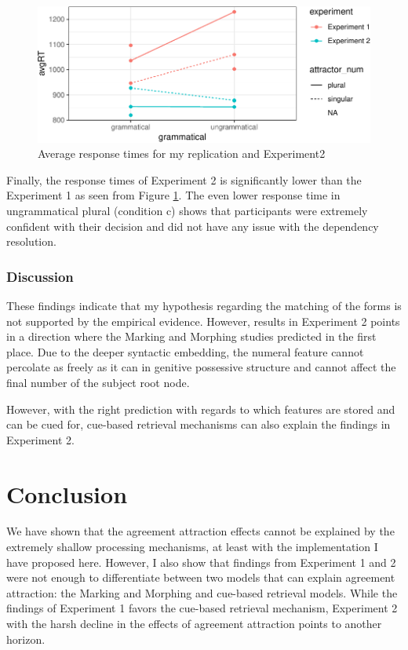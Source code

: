 \documentclass[doc]{apa6}
\begin{document}
\begin{figure}
\centering
\includegraphics{AgreementAttraction_files/figure-latex/exp2AvgRTs-1.pdf}
\caption{\label{fig:exp2AvgRTs}Average response times for my replication and Experiment2}
\end{figure}

Finally, the response times of Experiment 2 is significantly lower than the Experiment 1 as seen from Figure \ref{fig:exp2AvgRTs}. The even lower response time in ungrammatical plural (condition c) shows that participants were extremely confident with their decision and did not have any issue with the dependency resolution.

\hypertarget{discussion-1}{%
\subsubsection{Discussion}\label{discussion-1}}

These findings indicate that my hypothesis regarding the matching of the forms is not supported by the empirical evidence. However, results in Experiment 2 points in a direction where the Marking and Morphing studies predicted in the first place. Due to the deeper syntactic embedding, the numeral feature cannot percolate as freely as it can in genitive possessive structure and cannot affect the final number of the subject root node.

However, with the right prediction with regards to which features are stored and can be cued for, cue-based retrieval mechanisms can also explain the findings in Experiment 2.

\hypertarget{conclusion}{%
\section{Conclusion}\label{conclusion}}

We have shown that the agreement attraction effects cannot be explained by the extremely shallow processing mechanisms, at least with the implementation I have proposed here. However, I also show that findings from Experiment 1 and 2 were not enough to differentiate between two models that can explain agreement attraction: the Marking and Morphing and cue-based retrieval models. While the findings of Experiment 1 favors the cue-based retrieval mechanism, Experiment 2 with the harsh decline in the effects of agreement attraction points to another horizon.
\end{document}
